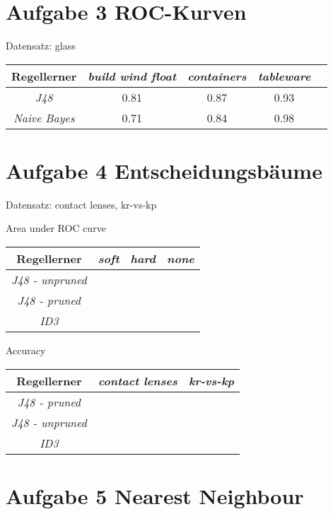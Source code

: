 
\section{Aufgabe 3 ROC-Kurven}
\label{sec:aufgabe_3_ROC_kurven}

Datensatz: glass

\begin{tabular}{c|c|c|c|c}
				Regellerner       & \emph{build wind float} & \emph{containers} & \emph{tableware}  \\ \hline
				\emph{J48}			& 0.81 & 0.87 & 0.93  \\ \hline
				\emph{Naive Bayes}  & 0.71 & 0.84 & 0.98  
\end{tabular}


\section{Aufgabe 4 Entscheidungsb\"aume}
\label{sec:aufgabe_4_entscheidungsbaume}

Datensatz: contact lenses, kr-vs-kp

Area under ROC curve

\begin{tabular}{c|c|c|c}
				Regellerner       & \emph{soft} & \emph{hard} & \emph{none}  \\ \hline
				\emph{J48 - unpruned} &  &  &   \\ \hline
				\emph{J48 - pruned}  &  &  &  \\ \hline
				\emph{ID3}  &  &  &  \\ \hline
\end{tabular}

Accuracy

\begin{tabular}{c|c|c}
				Regellerner       & \emph{contact lenses} & \emph{kr-vs-kp}  \\ \hline
				\emph{J48 - pruned} &   &   \\ \hline
				\emph{J48 - unpruned}  & &  \\ \hline
				\emph{ID3}  &  \\ \hline
\end{tabular}





\section{Aufgabe 5 Nearest Neighbour}
\label{sec:aufgabe_4_nearest_neighbour}

